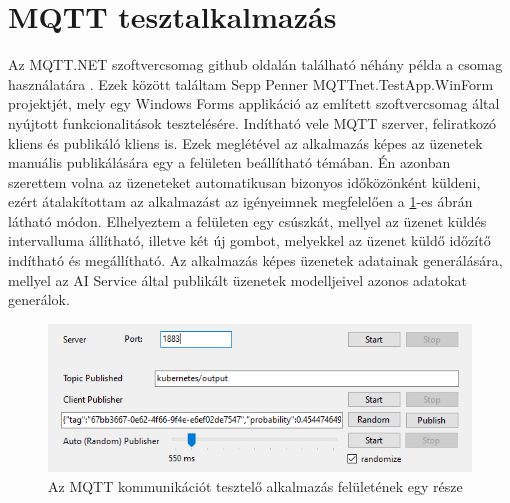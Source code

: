 \section{MQTT tesztalkalmazás}
Az MQTT.NET szoftvercsomag github oldalán található néhány példa a csomag használatára \cite{mqttnet-examples}.
Ezek között találtam Sepp Penner MQTTnet.TestApp.WinForm \cite{mqttnet-winforms} projektjét, 
mely egy Windows Forms applikáció az említett szoftvercsomag által nyújtott funkcionalitások tesztelésére.
Indítható vele MQTT szerver, feliratkozó kliens és publikáló kliens is.
Ezek meglétével az alkalmazás képes az üzenetek manuális publikálására egy a felületen beállítható témában.
Én azonban szerettem volna az üzeneteket automatikusan bizonyos időközönként küldeni,
ezért átalakítottam az alkalmazást az igényeimnek megfelelően a \ref{fig:mqtt-tester}-es ábrán látható módon.
Elhelyeztem a felületen egy csúszkát, mellyel az üzenet küldés intervalluma állítható, illetve két új gombot,
melyekkel az üzenet küldő időzítő indítható és megállítható.
Az alkalmazás képes üzenetek adatainak generálására, mellyel az AI Service által publikált üzenetek modelljeivel azonos adatokat generálok.
\begin{figure}[!ht]
    \centering
    \includegraphics[width=150mm, keepaspectratio]{figures/MQTT-Tester.png}
    \caption{Az MQTT kommunikációt tesztelő alkalmazás felületének egy része}
    \label{fig:mqtt-tester}
\end{figure}
